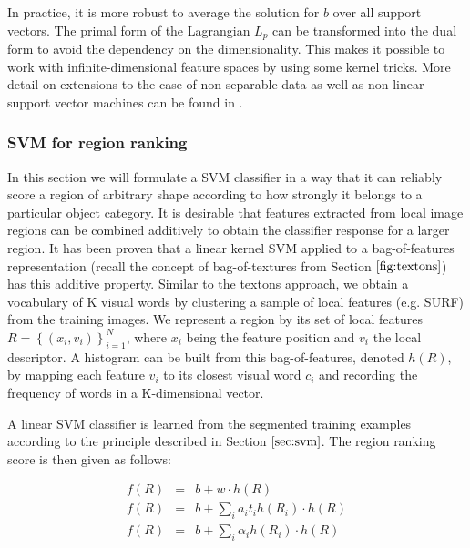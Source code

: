 \documentclass{SMBV12}
\begin{document}
In practice, it is more robust to average the solution for $b$ over all support vectors. The primal form of the Lagrangian $L_p$ can be transformed into the dual form to avoid the dependency on the dimensionality. This makes it possible to work with infinite-dimensional feature spaces by using some kernel tricks. More detail on extensions to the case of non-separable data as well as non-linear support vector machines can be found in \cite{burges1998tutorial}.



\subsubsection{SVM for region ranking}

In this section we will formulate a SVM classifier in a way that it can reliably score a region of arbitrary shape according to how strongly it belongs to a particular object category. It is desirable that features extracted from local image regions can be combined additively to obtain the classifier response for a larger region. It has been proven \cite{lampert2008beyond} that a linear kernel SVM applied to a bag-of-features representation (recall the concept of bag-of-textures from Section $\ref{fig:textons}$) has this additive property. Similar to the textons approach, we obtain a vocabulary of K visual words by clustering a sample of local features (e.g. SURF) from the training images. We represent a region by its set of local features $R = \left\lbrace (x_i, v_i) \right\rbrace _{i=1} ^ N$, where $x_i$ being the feature position and $v_i$ the local descriptor. A histogram can be built from this bag-of-features, denoted $h(R)$, by mapping each feature $v_i$ to its closest visual word $c_i$ and recording the frequency of words in a K-dimensional vector.

A linear SVM classifier is learned from the segmented training examples according to the principle described in Section $\ref{sec:svm}$. The region ranking score is then given as follows:

\begin{equation}
\label{eq:svm_classifier}
\begin{array}{lcl}
f(R) & = & b + w \cdot h(R)\\
f(R) & = & b + \sum_{i}a_i t_i h(R_i) \cdot h(R)\\
f(R) & = & b + \sum_{i}\alpha_i h(R_i) \cdot h(R)
\end{array}
\end{equation}
\end{document}
